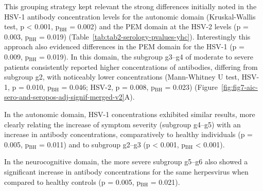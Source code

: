 This grouping strategy kept relevant the strong differences initially noted in the HSV-1 antibody concentration levels for the autonomic domain (Kruskal-Wallis test, p < 0.001, p$_{\text{BH}}$ = 0.002) 
and the 
PEM domain at the HSV-2 levels (p = 0.003, p$_{\text{BH}}$ = 0.019) (Table~\ref{tab:tab2-serology-pvalues-yhc}).
Interestingly this approach also evidenced differences in the PEM domain for the HSV-1 (p = 0.009, p$_{\text{BH}}$ = 0.019).
In this domain, the subgroup g3--g4 of moderate to severe \cfs patients consistently reported higher concentrations of antibodies, differing from subgroup g2, with noticeably lower concentrations (Mann-Whitney U test, HSV-1, p = 0.010, p$_{\text{BH}}$ = 0.046; HSV-2, p = 0.008, p$_{\text{BH}}$ = 0.023) (Figure~\ref{fig:fig7-aic-sero-and-seropos-adj-signif-merged-v2}A).

In the autonomic domain, HSV-1 concentrations exhibited similar results, more clearly relating the increase of symptom severity (subgroup g4--g5) with an increase in antibody concentrations, comparatively to healthy individuals (p = 0.005, p$_{\text{BH}}$ = 0.011) and to subgroup g2--g3 (p < 0.001, p$_{\text{BH}}$ < 0.001).

In the neurocognitive domain, the more severe subgroup g5--g6 also showed a significant increase in antibody concentrations for the same herpesvirus when compared to healthy controls (p = 0.005, p$_{\text{BH}}$ = 0.021).

